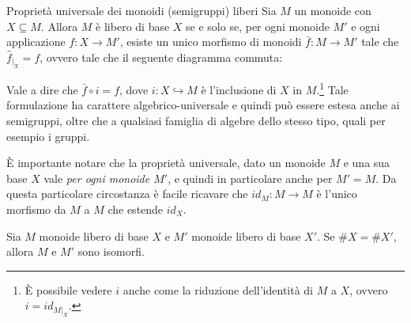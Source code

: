 \begin{theorem}{Proprietà universale dei monoidi (semigruppi) liberi}
  Sia \(M\) un monoide con \(X \subseteq M\). Allora \(M\) è libero di base \(X\) se e solo se, per ogni monoide \(M'\) e ogni applicazione \(f: X \to M'\), esiste un unico morfismo di monoidi \(\bar{f}: M \to M'\) tale che \(\hat{f}_{|_X} = f\), ovvero tale che il seguente diagramma commuta:
  \begin{center}
  \end{center}
  Vale a dire che \(\bar{f} \circ i = f\), dove \(i: X \hookrightarrow M\) è l'inclusione di \(X\) in \(M\).\footnote{È possibile vedere \(i\) anche come la riduzione dell'identità di \(M\) a \(X\), ovvero \(i = id_{M|_X}\).}
  Tale formulazione ha carattere algebrico-universale e quindi può essere estesa anche ai semigruppi, oltre che a qualsiasi famiglia di algebre dello stesso tipo, quali per esempio i gruppi.
\end{theorem}

È importante notare che la proprietà universale, dato un monoide \(M\) e una sua base \(X\) vale \emph{per ogni monoide \(M'\)}, e quindi in particolare anche per \(M' = M\).
Da questa particolare circostanza è facile ricavare che \(id_M: M \to M\) è l'unico morfismo da \(M\) a \(M\) che estende \(id_X\).

\begin{corollary}{}
  Sia \(M\) monoide libero di base \(X\) e \(M'\) monoide libero di base \(X'\).
  Se \(\#X = \#X'\), allora \(M\) e \(M'\) sono isomorfi.
\end{corollary}

